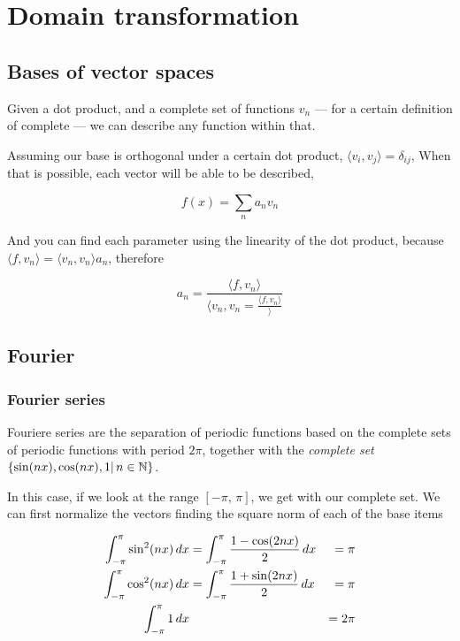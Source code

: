 \documentclass[../main/main.tex]{subfiles}
\begin{document}
\section{Domain transformation}

\subsection{Bases of vector spaces}

Given a dot product, and a complete set of functions ${v_{n}}$ --- for a certain definition of complete --- we can describe any function within that.

Assuming our base is orthogonal under a certain dot product, $\langle v_{i},v_{j}\!\rangle = \delta_{ij}$, When that is possible, each vector will be able to be described,

\begin{equation}
f(x) = \sum_{n}a_{n} v_{n}
\end{equation}

And you can find each parameter using the linearity of the dot product,  because $\langle f,\! v_{n}\rangle = \langle v_{n},\! v_{n}\rangle a_{n}$, therefore

\begin{equation}
a_{n} = \frac{\langle f,\! v_{n}\rangle}{\langle v_{n},\! v_{n} = \frac{\langle f,\! v_{n}\rangle}\rangle}
\end{equation}


	

\subsection{Fourier}


\subsubsection{Fourier series}

Fouriere series are the separation of periodic functions based on the complete sets  of periodic functions with period $2\pi$, together with the \emph{complete set} $\left\{\sin (nx), \cos(nx), 1 | \,n \in \mathbb{N}\right\}$.

	In this case, if we look at the range  $[-\pi,\, \pi]$, we get with our complete set. We can first normalize the vectors finding the square norm of each of the base items

	\begin{align}
	\fourierint{\sin^{2}(nx)} &=\fourierint{\frac{1-\cos(2nx)}{2}}  &=\pi  \\
	\fourierint{\cos^{2}(nx)} &=\fourierint{\frac{1+\sin(2nx)}{2}}  &=\pi  \\
	\fourierint{1} &&=2\pi  
	\end{align}
	
\end{document}

